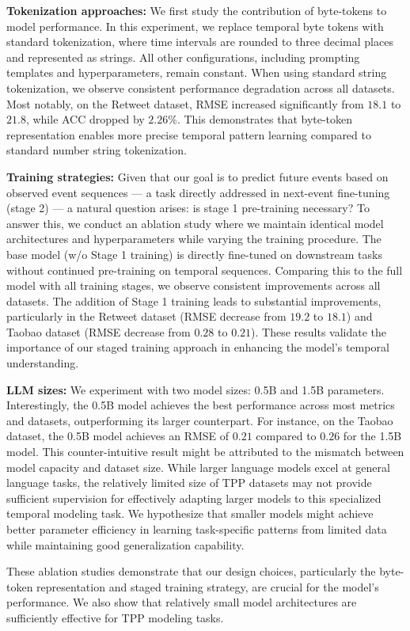 \textbf{Tokenization approaches:} We first study the contribution of byte-tokens to model performance. 
In this experiment, we replace temporal byte tokens with standard tokenization, where time intervals are rounded to three decimal places and represented as strings. 
All other configurations, including prompting templates and hyperparameters, remain constant. When using standard string tokenization, we observe consistent performance degradation across all datasets. Most notably, on the Retweet dataset, RMSE increased significantly from $18.1$ to $21.8$, while ACC dropped by $2.26\%$. This demonstrates that byte-token representation enables more precise temporal pattern learning compared to standard number string tokenization. 

\textbf{Training strategies:} 
Given that our goal is to predict future events based on observed event sequences --- a task directly addressed in next-event fine-tuning (stage 2) --- a natural question arises: is stage 1 pre-training necessary? To answer this, we conduct an ablation study where we maintain identical model architectures and hyperparameters while varying the training procedure. The base model (w/o Stage 1 training) is directly fine-tuned on downstream tasks without continued pre-training on temporal sequences.
Comparing this to the full model with all training stages, we observe consistent improvements across all datasets. The addition of Stage 1 training leads to substantial improvements, particularly in the Retweet dataset (RMSE decrease from $19.2$ to $18.1$) and Taobao dataset (RMSE decrease from $0.28$ to $0.21$). These results validate the importance of our staged training approach in enhancing the model's temporal understanding. 

\textbf{LLM sizes:} We experiment with two model sizes: 0.5B and 1.5B parameters. Interestingly, the 0.5B model achieves the best performance across most metrics and datasets, outperforming its larger counterpart. For instance, on the Taobao dataset, the 0.5B model achieves an RMSE of $0.21$ compared to $0.26$ for the 1.5B model.
This counter-intuitive result might be attributed to the mismatch between model capacity and dataset size. While larger language models excel at general language tasks, the relatively limited size of TPP datasets may not provide sufficient supervision for effectively adapting larger models to this specialized temporal modeling task. We hypothesize that smaller models might achieve better parameter efficiency in learning task-specific patterns from limited data while maintaining good generalization capability.

These ablation studies demonstrate that our design choices, particularly the byte-token representation and staged training strategy, are crucial for the model's performance.
We also show that relatively small model architectures are sufficiently effective for TPP modeling tasks.



